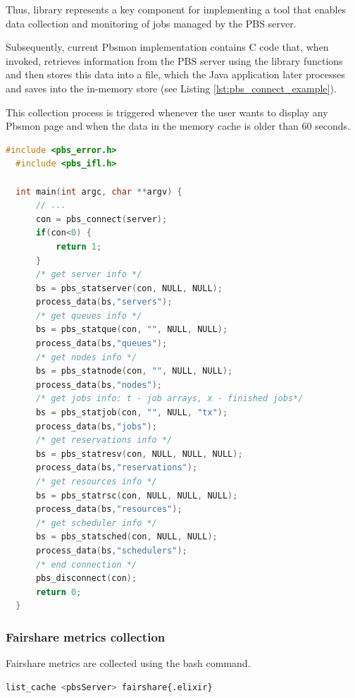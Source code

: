 \documentclass[
  digital,     %
  oneside,     %
  nosansbold,  %
  nocolorbold, %
  lof,         %
  lot,         %
]{fithesis4}
\begin{document}
Thus, library represents a key component for implementing a tool that enables data collection and monitoring of jobs managed by the PBS server.


Subsequently, current Pbsmon implementation contains C code that, when invoked, retrieves information from the PBS server using the library functions and then stores this data into a file, which the Java application later processes and saves into the in-memory store (see Listing \ref{lst:pbs_connect_example}).

This collection process is triggered whenever the user wants to display any Pbsmon page and when the data in the memory cache is older than 60 seconds.

\newpage
\begin{lstlisting}[caption={Partial code snippet for data collection from PBS server},
  language=c, label={lst:pbs_connect_example}]
  #include <pbs_error.h>
  #include <pbs_ifl.h>

  int main(int argc, char **argv) {
      // ...
      con = pbs_connect(server);    
      if(con<0) {
          return 1;
      }
      /* get server info */
      bs = pbs_statserver(con, NULL, NULL);
      process_data(bs,"servers");
      /* get queues info */
      bs = pbs_statque(con, "", NULL, NULL);
      process_data(bs,"queues");
      /* get nodes info */
      bs = pbs_statnode(con, "", NULL, NULL);
      process_data(bs,"nodes");
      /* get jobs info: t - job arrays, x - finished jobs*/
      bs = pbs_statjob(con, "", NULL, "tx");
      process_data(bs,"jobs");
      /* get reservations info */
      bs = pbs_statresv(con, NULL, NULL, NULL);
      process_data(bs,"reservations");
      /* get resources info */
      bs = pbs_statrsc(con, NULL, NULL, NULL);
      process_data(bs,"resources");
      /* get scheduler info */
      bs = pbs_statsched(con, NULL, NULL);
      process_data(bs,"schedulers");
      /* end connection */
      pbs_disconnect(con);
      return 0;
  }  
\end{lstlisting}

\subsubsection{Fairshare metrics collection}
\label{subsubsec:fairshare-metrics-collection}

Fairshare metrics are collected using the bash command.

\begin{lstlisting}[caption={Metrics collection script},
  language=bash, label={lst:fairshare-metrics-collection}]
  list_cache <pbsServer> fairshare{.elixir}
\end{lstlisting}
\end{document}
